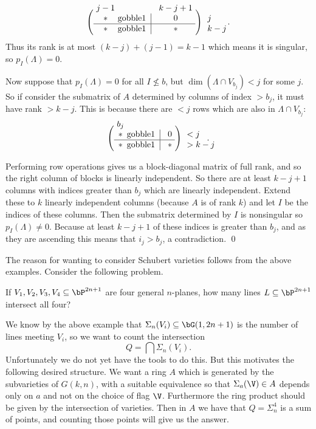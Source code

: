     \medskip
    $$ \left(\vcenter{\halign{\strut\hfil$#$\hfil&\@gobble{#1}\kern.2cm\vrule\kern.2cm&\hfil$#$\hfil&\rlap{\kern.5cm$#$}\cr
        \omit\hfil\rmht{\ $j-1$\ }\hfil&\omit&\omit\hfil\rmht{\ $k-j+1$\ }\hfil\cr
        *&&0&j\cr\noalign{\hrule}
        *&&*&k-j\cr
    }}\right)\kern1cm . $$
    Thus its rank is at most $(k-j)+(j-1)=k-1$ which means it is singular, so $p_I(\Lambda)=0$.

    Now suppose that $p_I(\Lambda)=0$ for all $I\not\leq b$, but $\dim(\Lambda\cap V_{b_j})<j$ for some $j$.
    So if consider the submatrix of $A$ determined by columns of index $>b_j$, it must have rank $>k-j$.
    This is because there are $<j$ rows which are also in $\Lambda\cap V_{b_j}$:

    \medskip
    $$ \left(\vcenter{\halign{\strut\hfil$#$\hfil&\@gobble{#1}\kern.2cm\vrule\kern.2cm&\hfil$#$\hfil&\rlap{\kern.5cm$#$}\cr
        \omit\hfil\rmht{\ $b_j$\ }\hfil\cr
        *&&\ 0\ &<j\cr\noalign{\hrule}
        *&&*&>k-j\cr
    }}\right)\kern1cm . $$

    Performing row operations gives us a block-diagonal matrix of full rank, and so the right column of blocks
    is linearly independent.
    So there are at least $k-j+1$ columns with indices greater than $b_j$ which are linearly independent.
    Extend these to $k$ linearly independent columns (because $A$ is of rank $k$) and let $I$ be the
    indices of these columns.
    Then the submatrix determined by $I$ is nonsingular so $p_I(\Lambda)\neq0$.
    Because at least $k-j+1$ of these indices is greater than $b_j$, and as they are ascending this means
    that $i_j>b_j$, a contradiction.
    \qed

\eproof

The reason for wanting to consider Schubert varieties follows from the above examples.
Consider the following problem.

\bprob[name={interfourq}]

    If $V_1,V_2,V_3,V_4\subseteq\bP^{2n+1}$ are four general $n$-planes, how many lines $L\subseteq\bP^{2n+1}$
    intersect all four?

\eprob

We know by the above example that $\Sigma_n(V_i)\subseteq\bG(1,2n+1)$ is the number of lines meeting $V_i$,
so we want to count the intersection
$$ Q = \bigcap\Sigma_n(V_i) . $$
Unfortunately we do not yet have the tools to do this.
But this motivates the following desired structure.
We want a ring $A$ which is generated by the subvarieties of $G(k,n)$, with a suitable equivalence so that
$\Sigma_a(\V)\in A$ depends only on $a$ and not on the choice of flag $\V$.
Furthermore the ring product should be given by the intersection of varieties.
Then in $A$ we have that $Q=\Sigma_n^4$ is a sum of points, and counting those points will give us the answer.

